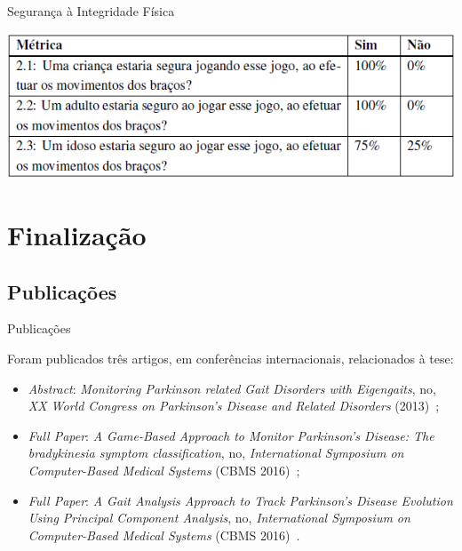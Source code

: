 \documentclass{beamer}
\begin{document}
\begin{frame}{Segurança à Integridade Física} 
    \begin{block}{}
			\center \includegraphics[height=1.4 in]{img/metricasq2.png}
    \end{block}
\end{frame}


\section{Finalização}
\subsection{Publicações}
\begin{frame}{Publicações}
\begin{block}{}
Foram publicados três artigos, em conferências internacionais, relacionados à tese: 
  \begin{itemize}
   \item \textit{Abstract}: \textit{Monitoring Parkinson related Gait Disorders with Eigengaits}, no, \textit{XX World Congress on Parkinson's Disease and Related Disorders} (2013)~\cite{lmmeigengaits2013};
   \item \textit{Full Paper}: \textit{A Game-Based Approach to Monitor Parkinson’s Disease: The bradykinesia symptom classification}, no, \textit{International Symposium on Computer-Based Medical Systems} (CBMS 2016)~\cite{lmmcbmsgame2016};
   \item \textit{Full Paper}: \textit{A Gait Analysis Approach to Track Parkinson’s Disease Evolution Using Principal Component Analysis}, no, \textit{International Symposium on Computer-Based Medical Systems} (CBMS 2016)~\cite{lmmcbmsgait2016}.
  \end{itemize}
\end{block}
\end{frame}
\end{document}
